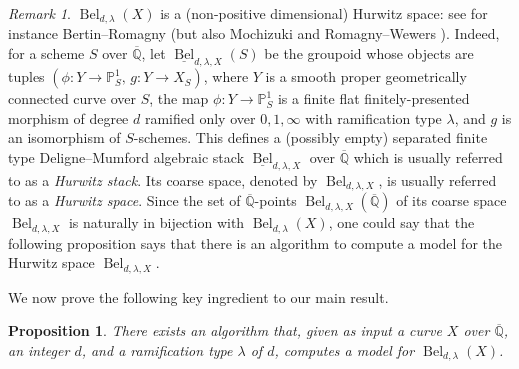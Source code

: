 \documentclass{amsproc}
\numberwithin{equation}{section}
\numberwithin{figure}{section}
\newtheorem{proposition}[equation]{Proposition}
\theoremstyle{definition}
\theoremstyle{remark}
\newtheorem{remark}[equation]{Remark}
\newcommand{\Qbar}{\overline{\mathbb{Q}}}
\DeclareMathOperator{\Bel}{Bel}
\newcommand{\jv}[1]{{\color{red} \textsf{[[#1]]}}}
\begin{document}
\begin{remark}
$\Bel_{d,\lambda}(X)$ is a (non-positive dimensional) Hurwitz space: see for instance Bertin--Romagny \cite[Section~6.6]{BertinRomagny} (but also Mochizuki \cite{Mochizuki} and Romagny--Wewers \cite{RomagnyWewers}).   Indeed, for a scheme $S$ over $\Qbar$, let $\underline{\Bel}_{d,\lambda,X}(S)$ be the groupoid whose objects are tuples $(\phi\colon Y\to \mathbb{P}^1_S,\,g\colon Y\to X_S)$, where $Y$ is a smooth proper geometrically connected curve over $S$, the map $\phi\colon Y\to \mathbb{P}^1_S$ is a finite flat finitely-presented morphism of degree $d$ ramified  only over $0,1,\infty$ with ramification type $\lambda$, and $g$ is an isomorphism of $S$-schemes. This defines a (possibly empty) separated %
finite type Deligne--Mumford  
algebraic stack $\underline{\Bel}_{d,\lambda,X}$ over $\Qbar$ which is usually referred to as a \emph{Hurwitz stack}.   Its coarse space, denoted by $\Bel_{d,\lambda,X}$, is usually referred to as a \emph{Hurwitz space}.  Since the set of $\Qbar$-points $\Bel_{d,\lambda,X}(\Qbar)$ of its coarse space  $\Bel_{d,\lambda,X}$ is naturally in bijection with $\Bel_{d,\lambda}(X)$, one could say that the following proposition says that there is an algorithm to compute a model for the Hurwitz space $\Bel_{d,\lambda,X}$.
\end{remark}

We now prove the following key ingredient to our main result.

\begin{proposition}\label{prop:eqns}
There exists an algorithm that, given as input a curve $X$ over $\Qbar$, an integer $d$, and a ramification type $\lambda$ of $d$, computes a model for $\Bel_{d,\lambda}(X)$.
\end{proposition}
\end{document}
